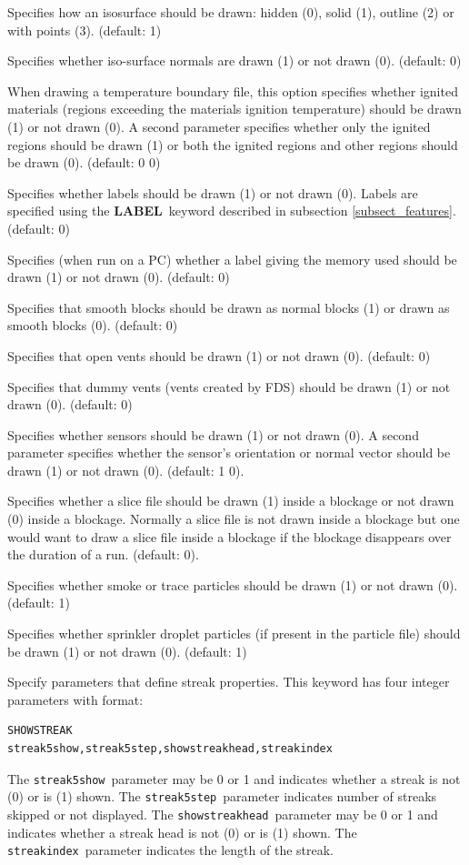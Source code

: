 \documentclass[11pt,twoside]{book}
\newcommand{\hitem}[1]{\item[{\bf #1} \hfill]}
\begin{document}
\hitem{SHOWISO}Specifies how an isosurface should be drawn: hidden (0), solid (1), outline (2) or with points (3).  (default: 1)

\hitem{SHOWISONORMALS} Specifies whether iso-surface normals are drawn (1) or not drawn (0).  (default: 0)

\hitem{SHOWIGNITION} When drawing a temperature boundary file, this option
specifies whether ignited materials (regions exceeding the materials ignition temperature) should be drawn (1) or not drawn (0).  A second parameter specifies whether only the ignited regions should be drawn (1) or both the ignited regions and other regions should be drawn (0).
(default: 0 0)


\hitem{SHOWLABELS}Specifies whether labels should be drawn (1) or
not drawn (0).  Labels are specified using the {\bf LABEL}\
keyword described in subsection \ref{subsect_features}. (default:
0)

\hitem{SHOWMEMLOAD} Specifies (when run on a PC) whether a label
giving the memory used should be drawn (1) or not drawn (0).
(default: 0)

\hitem{SHOWNORMALWHENSMOOTH} Specifies that smooth blocks
should be drawn as normal blocks (1) or drawn as smooth
blocks (0). (default: 0)

\hitem{SHOWOPENVENTS} Specifies that open vents should be drawn
(1) or not drawn (0).  (default: 0)

\hitem{SHOWDUMMYVENTS} Specifies that dummy vents (vents created
by FDS) should be drawn (1) or not drawn (0).  (default: 0)

\hitem{SHOWSENSORS} Specifies whether sensors should be drawn (1) or not drawn (0).
A second parameter specifies whether the sensor's orientation or normal vector
should be drawn (1) or not drawn (0). (default: 1 0).

\hitem{SHOWSLICEINOBST} Specifies whether a slice file should be drawn (1) inside
a blockage or not drawn (0) inside a blockage.  Normally a slice file is not drawn inside a blockage but one would want to draw a
slice file inside a blockage if the blockage disappears over the duration of a run.  (default: 0).


\hitem{SHOWSMOKEPART}Specifies whether smoke or trace particles
should be drawn (1) or not drawn (0). (default: 1)

\hitem{SHOWSPRINKPART}Specifies whether
sprinkler droplet particles (if present in the particle file)
should be drawn (1) or not drawn (0).
(default: 1)

\hitem{SHOWSTREAK}Specify parameters that define streak properties.  This keyword
has four integer parameters with format:
\begin{verbatim}
SHOWSTREAK
streak5show,streak5step,showstreakhead,streakindex
\end{verbatim}
The {\tt streak5show}\ parameter may be 0 or 1 and indicates whether a
streak is not (0) or is (1) shown. The {\tt streak5step}\ parameter
indicates number of streaks skipped or not displayed.
The {\tt showstreakhead}\ parameter may be 0 or 1 and indicates whether a streak head is not (0) or is (1) shown.
The {\tt streakindex}\ parameter indicates the length of the streak.
\end{document}
